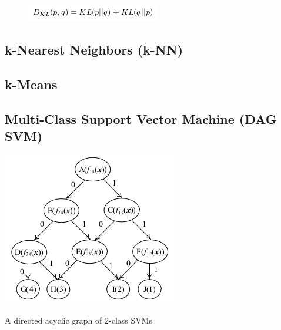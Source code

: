 \documentclass{article} %
\begin{document}


\begin{figure}[!hb]
  \centering
  \includegraphics[width=.38\textwidth]{images/techniques-kldiv-dkleqn.png}
\end{figure}

\subsection{k-Nearest Neighbors (k-NN)}



\subsection{k-Means}



\subsection{Multi-Class Support Vector Machine (DAG SVM)}

\begin{minipage}{.5\textwidth}\centering
  \includegraphics[width=.58\textwidth]{images/techniques-dag-example.png}

  A directed acyclic graph of 2-class SVMs
\end{minipage}
\begin{minipage}{.5\textwidth}%

\end{minipage}
\end{document}
